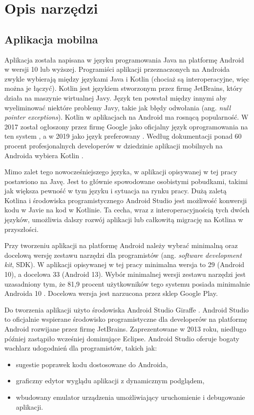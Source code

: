 \documentclass[a4paper,twoside,12pt]{book}
\newcommand{\obcy}[1]{\emph{#1}}
\newcommand{\english}[1]{{\selectlanguage{british}\obcy{#1}}}
\begin{document}
\section{Opis narzędzi}

%
\subsection{Aplikacja mobilna}
Aplikacja została napisana w języku programowania Java na platformę Android w wersji 10 lub wyższej. Programiści aplikacji przeznaczonych na Androida zwykle wybierają między językami Java i Kotlin (chociaż są interoperacyjne, więc można je łączyć). Kotlin jest językiem stworzonym przez firmę JetBrains, który działa na maszynie wirtualnej Javy. Język ten powstał między innymi aby wyeliminować niektóre problemy Javy, takie jak błędy odwołania (ang. \english{null pointer exceptions}). Kotlin w aplikacjach na Android ma rosnącą popularność. W 2017 został ogłoszony przez firmę Google jako oficjalny język oprogramowania na ten system \cite{bib:internetKotlin17}, a w 2019 jako język preferowany \cite{bib:internetKotlin19}. Według dokumentacji ponad 60 procent profesjonalnych developerów w dziedzinie aplikacji mobilnych na Androida wybiera Kotlin \cite{bib:internetKotlin19}.

Mimo zalet tego nowocześniejszego języka, w aplikacji opisywanej w tej pracy postawiono na Javę. Jest to głównie spowodowane osobistymi pobudkami, takimi jak większa pewność w tym języku i sytuacja na rynku pracy. Dużą zaletą Kotlina i środowiska programistycznego Android Studio jest możliwość konwersji kodu w Javie na kod w Kotlinie. Ta cecha, wraz z interoperacyjnością tych dwóch języków, umożliwia dalszy rozwój aplikacji lub całkowitą migrację na Kotlina w przyszłości. 

Przy tworzeniu aplikacji na platformę Android należy wybrać minimalną oraz docelową wersję zestawu narzędzi dla programistów (ang. \english{software development kit}, SDK). W aplikacji opisywanej w tej pracy minimalna wersja to 29 (Android 10), a docelowa 33 (Android 13). Wybór minimalnej wersji zestawu narzędzi jest uzasadniony tym, że 81,9 procent użytkowników tego systemu posiada minimalnie Androida 10 \cite{bib:internetapilevels}. Docelowa wersja jest narzucona przez sklep Google Play. 

Do tworzenia aplikacji użyto środowiska Android Studio Giraffe \cite{bib:androidStudio}. Android Studio to oficjalnie wspierane środowisko programistyczne dla developerów na platformę Android rozwijane przez firmę JetBrains. Zaprezentowane w 2013 roku, niedługo później zastąpiło wcześniej dominujące Eclipse. Android Studio oferuje bogaty wachlarz udogodnień dla programistów, takich jak:
\begin{itemize}
\item sugestie poprawek kodu dostosowane do Androida,
\item graficzny edytor wyglądu aplikacji z dynamicznym podglądem,
\item wbudowany emulator urządzenia umożliwiający uruchomienie i debugowanie aplikacji.
\end{itemize}
 
\end{document}
